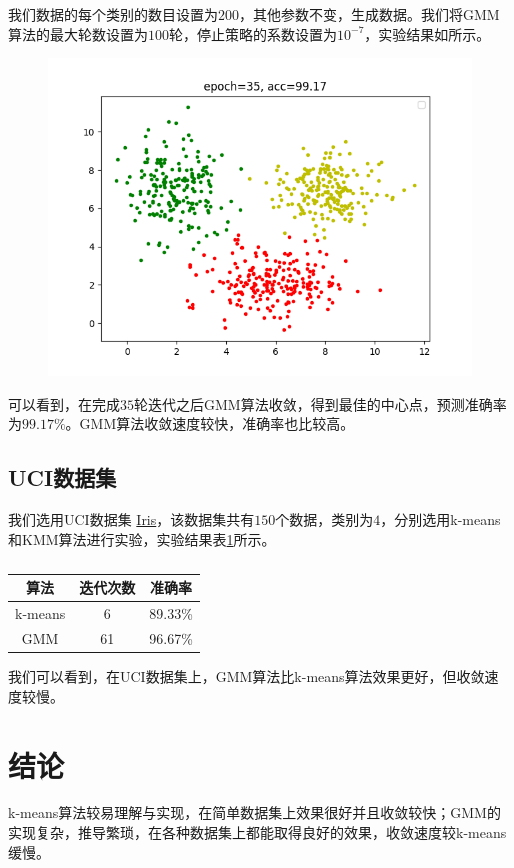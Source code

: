 \documentclass[lang=cn,11pt,a4paper,cite=authoryear]{elegantpaper}
\begin{document}
我们数据的每个类别的数目设置为$200$，其他参数不变，生成数据。我们将GMM算法的最大轮数设置为$100$轮，停止策略的系数设置为$10^{-7}$，实验结果如所示。

\begin{figure}[h]
	\centering
	\includegraphics[width=0.7\linewidth]{images/ml_lab3_3.png}
	\caption{}
	\label{fig:mllab33}
\end{figure}

可以看到，在完成$35$轮迭代之后GMM算法收敛，得到最佳的中心点，预测准确率为$99.17\%$。GMM算法收敛速度较快，准确率也比较高。

\subsection{UCI数据集}

我们选用UCI数据集 \href{http://archive.ics.uci.edu/ml/datasets/Iris}{Iris}，该数据集共有$150$个数据，类别为$4$，分别选用k-means和KMM算法进行实验，实验结果表\ref{table:1}所示。

\begin{table}[h]
	\centering
	\begin{tabular}{ccc}
		\textbf{算法} & \textbf{迭代次数} & \textbf{准确率} \\ \hline
		k-means & 6 & 89.33\% \\
		GMM & 61 & 96.67\%
	\end{tabular}
	\caption{}
	\label{table:1}
\end{table}

我们可以看到，在UCI数据集上，GMM算法比k-means算法效果更好，但收敛速度较慢。


\section{结论}

k-means算法较易理解与实现，在简单数据集上效果很好并且收敛较快；GMM的实现复杂，推导繁琐，在各种数据集上都能取得良好的效果，收敛速度较k-means缓慢。
\end{document}
